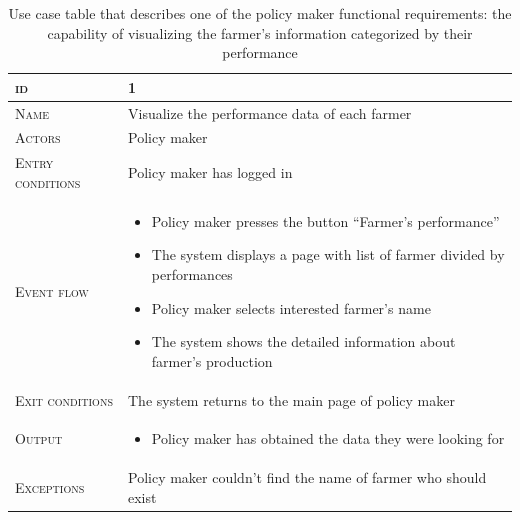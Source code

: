

\begin{table}[H]
    \centering
    \begin{tabular}{|l|p{}|}
        \hline %
    	\textsc{id}                 &   1\\
    	\hline %
    	\textsc{Name}               &   Visualize the performance data of each farmer\\
    	\hline %
    	\textsc{Actors}             &   Policy maker\\
    	\hline %
    	\textsc{Entry conditions}   &   Policy maker has logged in\\
    	\hline %
    	\textsc{Event flow}         &   %
            	                        \begin{itemize}
                                    	    \item Policy maker presses the button “Farmer’s performance”
                                    		\item The system displays a page with list of farmer divided by performances
                                    		\item Policy maker selects interested farmer’s name
                                    		\item The system shows the detailed information about farmer’s production
                                        \end{itemize}\\
        \hline %
        \textsc{Exit conditions}    &  The system returns to the main page of policy maker\\
    	\hline %
    	\textsc{Output}             &  \begin{itemize}
    	    \item Policy maker has obtained the data they were looking for
    	\end{itemize}\\
    	\hline %
    	\textsc{Exceptions}         &  Policy maker couldn’t find the name of farmer who should exist\\
    	\hline %
        
    \end{tabular}
    \caption{\label{tab:visualize_farmer_performance}Use case table that describes one of the policy maker functional requirements:  the capability of visualizing the farmer's information categorized by their performance} %
\end{table}

